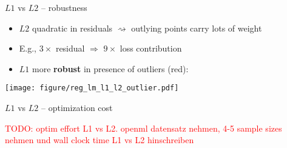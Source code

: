 \documentclass[11pt,compress,t,notes=noshow, xcolor=table]{beamer}
\begin{document}
\begin{vbframe}{$L1$ vs $L2$ -- robustness}

\begin{itemize}
    \item $L2$ quadratic in residuals $\rightsquigarrow$ outlying points 
    carry lots of weight
    \item E.g., $3 \times$ residual $\Rightarrow$ $9 \times$ loss contribution
    \item $L1$ more \textbf{robust} in presence of outliers (red):
\end{itemize}

\vfill
\texttt{[image: figure/reg\_lm\_l1\_l2\_outlier.pdf]}

\end{vbframe}


\begin{vbframe}{$L1$ vs $L2$ -- optimization cost}

\textcolor{red}{TODO: optim effort L1 vs L2. openml datensatz nehmen, 4-5 sample 
sizes nehmen und wall clock time L1 vs L2 hinschreiben}

\end{vbframe}

\endlecture
\end{document}
